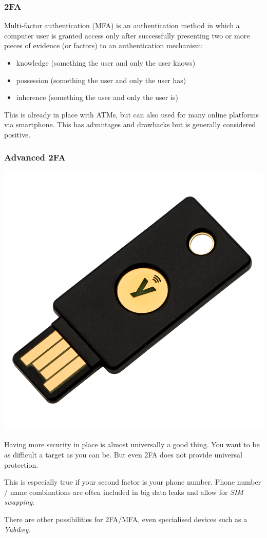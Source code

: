 \documentclass[aspectratio=169,dvipsnames]{beamer}
\begin{document}
\begin{frame}
\frametitle{2FA}

Multi-factor authentication (MFA) is an authentication method in which a computer user is granted access only after successfully presenting two or more pieces of evidence (or factors) to an authentication mechanism:
\medskip

\begin{itemize}
\item knowledge (something the user and only the user knows)
\item possession (something the user and only the user has)
\item inherence (something the user and only the user is)
\end{itemize}
\pause\bigskip

This is already in place with ATMs, but can also used for many online platforms via smartphone. This has advantages and drawbacks but is generally considered positive.

\end{frame}

\begin{frame}
\frametitle{Advanced 2FA}
\begin{minipage}{0.5\textwidth}
\begin{center}
\includegraphics[height=0.65\textwidth, keepaspectratio]{images/yubikey}
\end{center}
\end{minipage}%
\begin{minipage}{0.5\textwidth}
Having more security in place is almost universally a good thing. You want to be as difficult a target as you can be. But even 2FA does not provide universal protection.
\pause\bigskip

This is especially true if your second factor is your phone number. Phone number / name combinations are often included in big data leaks and allow for \emph{SIM swapping}.
\pause\bigskip

There are other possibilities for 2FA/MFA, even specialised devices such as a \emph{Yubikey}.
\end{minipage}
\end{frame}
\end{document}
